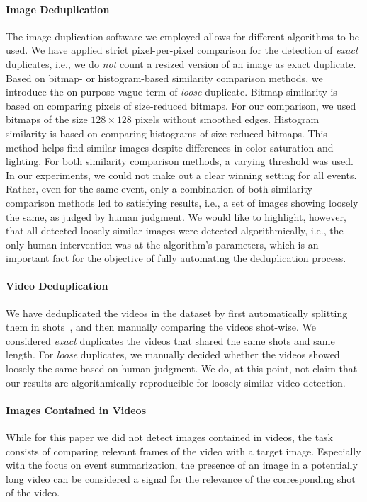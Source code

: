 \documentclass{acm_proc_article-sp}
\let\oldemph\emph
\renewcommand{\emph}[1]{\oldemph{\fontsize{9}{9}\selectfont #1}}
\begin{document}
\paragraph{Image Deduplication}
The image duplication software we employed allows for different algorithms to be used.
We have applied strict pixel-per-pixel comparison for the detection of \emph{exact} duplicates, i.e.,
we do \emph{not} count a resized version of an image as exact duplicate.
Based on bitmap- or histogram-based similarity comparison methods, we introduce the on purpose vague term of \emph{loose} duplicate.
Bitmap similarity is based on comparing pixels of size-reduced bitmaps.
For our comparison, we used bitmaps of the size $128 \times 128$ pixels without smoothed edges.
Histogram similarity is based on comparing histograms of size-reduced bitmaps.
This method helps find similar images despite differences in color saturation and lighting.
For both similarity comparison methods, a varying threshold was used.
In our experiments, we could not make out a clear winning setting for all events.
Rather, even for the same event,
only a combination of both similarity comparison methods led to satisfying results,
i.e., a set of images showing loosely the same, as judged by human judgment.
We would like to highlight, however, that all detected loosely similar images were detected algorithmically,
i.e., the only human intervention was at the algorithm's parameters,
which is an important fact for the objective of fully automating the deduplication process.

\paragraph{Video Deduplication}
We have deduplicated the videos in the dataset by first automatically splitting them in shots~\cite{CrowdsourcingEvent}, and then manually comparing the videos shot-wise.
We considered \emph{exact} duplicates the videos that shared the same shots and same length.
For \emph{loose} duplicates, we manually decided whether the videos showed loosely the same based on human judgment.
We do, at this point, not claim that our results are algorithmically reproducible for loosely similar video detection.

\paragraph{Images Contained in Videos}
While for this paper we did not detect images contained in videos,
the task consists of comparing relevant frames of the video with a target image.
Especially with the focus on event summarization,
the presence of an image in a potentially long video can be considered a signal for the relevance of the corresponding shot of the video.
\end{document}
